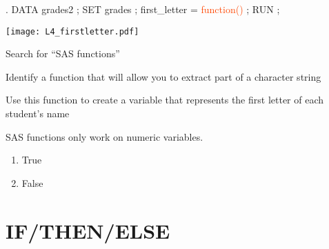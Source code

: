 \begin{frame}[fragile]
\begin{code}{.}
DATA grades2 ;
   SET grades ;
   first_letter = \textcolor{OrangeRed}{function()} ;
RUN ;
\end{code}
\emp
{}\hspace{1in}\emp
{}
\texttt{[image: L4\_firstletter.pdf]}
\emp\\
\vskip10pt
\oyo
\bi
\item Search for ``SAS functions''
\item Identify a function that will allow you to extract part of a character string
\item Use this function to create a variable that represents the first letter of each student's name
\ei

\end{frame}

\begin{frame}
\begin{clicker}{SAS functions only work on numeric variables.}
\begin{enumerate}
    \item True
    \item False
\end{enumerate}
\end{clicker}
\end{frame}


\section[IF/THEN/ELSE]{IF/THEN/ELSE}
\subsection{}
\begin{frame}
\end{frame}

